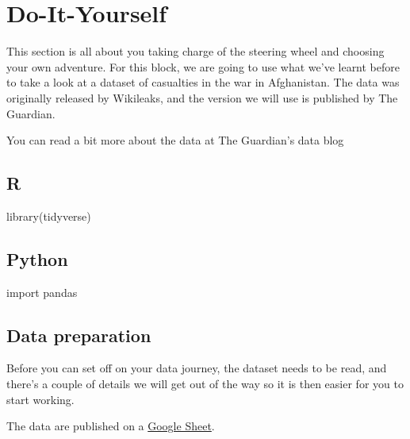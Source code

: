 \documentclass[
  letterpaper,
  DIV=11,
  numbers=noendperiod]{scrreprt}
\newenvironment{Shaded}{\begin{snugshade}}{\end{snugshade}}
\newcommand{\FunctionTok}[1]{\textcolor[rgb]{0.28,0.35,0.67}{#1}}
\newcommand{\ImportTok}[1]{\textcolor[rgb]{0.00,0.46,0.62}{#1}}
\newcommand{\NormalTok}[1]{\textcolor[rgb]{0.00,0.23,0.31}{#1}}
\begin{document}
\chapter*{Do-It-Yourself}\label{sec-open-science-DIY}


This section is all about you taking charge of the steering wheel and
choosing your own adventure. For this block, we are going to use what
we've learnt before to take a look at a dataset of casualties in the war
in Afghanistan. The data was originally released by Wikileaks, and the
version we will use is published by The Guardian.

You can read a bit more about the data at The Guardian's data blog

\section{R}

\begin{Shaded}
\begin{Highlighting}[]
\FunctionTok{library}\NormalTok{(tidyverse)}
\end{Highlighting}
\end{Shaded}

\section{Python}

\begin{Shaded}
\begin{Highlighting}[]
\ImportTok{import}\NormalTok{ pandas}
\end{Highlighting}
\end{Shaded}

\section*{Data preparation}\label{data-preparation}


Before you can set off on your data journey, the dataset needs to be
read, and there's a couple of details we will get out of the way so it
is then easier for you to start working.

The data are published on a
\href{https://docs.google.com/spreadsheets/d/1EAx8_ksSCmoWW_SlhFyq2QrRn0FNNhcg1TtDFJzZRgc/edit?hl=en\#gid=1}{Google
Sheet}.
\end{document}
